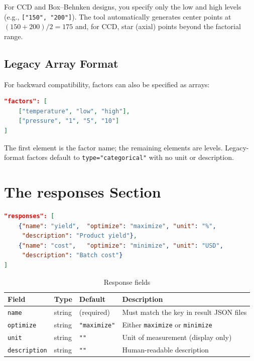\documentclass[11pt]{book}
\begin{document}
\begin{keypoint}
For CCD and Box--Behnken designs, you specify only the low and high levels (e.g., \texttt{["150", "200"]}). The tool automatically generates center points at $(150+200)/2 = 175$ and, for CCD, star (axial) points beyond the factorial range.
\end{keypoint}

\subsection{Legacy Array Format}

For backward compatibility, factors can also be specified as arrays:

\begin{lstlisting}[language=json]
"factors": [
    ["temperature", "low", "high"],
    ["pressure", "1", "5", "10"]
]
\end{lstlisting}

The first element is the factor name; the remaining elements are levels. Legacy-format factors default to \texttt{type="categorical"} with no unit or description.

\section{The responses Section}

\begin{lstlisting}[language=json]
"responses": [
    {"name": "yield",  "optimize": "maximize", "unit": "%",
     "description": "Product yield"},
    {"name": "cost",   "optimize": "minimize", "unit": "USD",
     "description": "Batch cost"}
]
\end{lstlisting}

\begin{table}[H]
\centering
\caption{Response fields}
\begin{tabular}{@{}lllp{5cm}@{}}
\toprule
\textbf{Field} & \textbf{Type} & \textbf{Default} & \textbf{Description} \\
\midrule
\texttt{name} & string & (required) & Must match the key in result JSON files \\
\texttt{optimize} & string & \texttt{"maximize"} & Either \texttt{maximize} or \texttt{minimize} \\
\texttt{unit} & string & \texttt{""} & Unit of measurement (display only) \\
\texttt{description} & string & \texttt{""} & Human-readable description \\
\bottomrule
\end{tabular}
\end{table}
\end{document}
